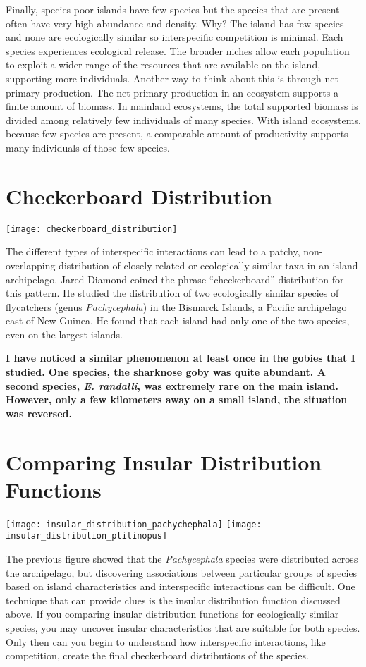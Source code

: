 \documentclass[letterpaper]{tufte-handout}
\begin{document}
Finally, species-poor islands have few species but the species that are present often have very high abundance and density. Why?  The island has few species and none are ecologically similar so interspecific competition is minimal.  Each species experiences ecological release.  The broader niches allow each population to exploit a wider range of the resources that are available on the island, supporting more individuals.  Another way to think about this is through net primary production. The net primary production in an ecosystem supports a finite amount of biomass. In mainland ecosystems, the total supported biomass is divided among relatively few individuals of many species. With island ecosystems, because few species are present, a comparable amount of productivity supports many individuals of those few species.

\section{Checkerboard Distribution}
\begin{marginfigure}
	\texttt{[image: checkerboard\_distribution]}
\end{marginfigure} 
The different types of interspecific interactions can lead to a patchy, non-overlapping distribution of closely related or ecologically similar taxa in an island archipelago.  Jared Diamond coined the phrase ``checkerboard'' distribution for this pattern.  He studied the distribution of two ecologically similar species of flycatchers (genus \textit{Pachycephala}) in the Bismarck Islands, a Pacific archipelago east of New Guinea.  He found that each island had only one of the two species, even on the largest islands.  

\textbf{I have noticed a similar phenomenon at least once in the gobies that I studied.  One species, the sharknose goby was quite abundant.  A second species, \textit{E. randalli}, was extremely rare on the main island.  However, only a few kilometers away on a small island, the situation was reversed.}


\section{Comparing Insular Distribution Functions}
\begin{marginfigure}
	\texttt{[image: insular\_distribution\_pachychephala]}
	\texttt{[image: insular\_distribution\_ptilinopus]}\\
\end{marginfigure}
The previous figure showed that the \textit{Pachycephala} species were distributed across the archipelago, but discovering  associations between particular groups of species based on island characteristics and interspecific interactions can be difficult.  One technique that can provide clues is the insular distribution function discussed above.  If you comparing insular distribution functions for ecologically similar species, you may uncover insular characteristics that are suitable for both species. Only then can you begin to understand how interspecific interactions, like competition, create the final checkerboard distributions of the species. 
\end{document}
